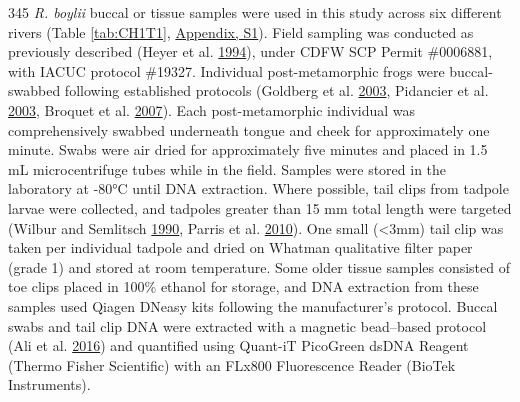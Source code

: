 \documentclass[proquest,12pt,final]{ucthesis-CA2012} %
\begin{document}
\begin{ucmainmatter}
345 \emph{R. boylii} buccal or tissue samples were used in this study
across six different rivers (Table \ref{tab:CH1T1},
\protect\hyperlink{supptables}{Appendix, S1}). Field sampling was
conducted as previously described (Heyer et al.
\protect\hyperlink{ref-heyer_measuring_1994}{1994}), under CDFW SCP
Permit \#0006881, with IACUC protocol \#19327. Individual
post-metamorphic frogs were buccal-swabbed following established
protocols (Goldberg et al.
\protect\hyperlink{ref-goldberg_frogs_2003}{2003}, Pidancier et al.
\protect\hyperlink{ref-pidancier_buccal_2003}{2003}, Broquet et al.
\protect\hyperlink{ref-broquet_buccal_2007}{2007}). Each
post-metamorphic individual was comprehensively swabbed underneath
tongue and cheek for approximately one minute. Swabs were air dried for
approximately five minutes and placed in 1.5 mL microcentrifuge tubes
while in the field. Samples were stored in the laboratory at -80°C until
DNA extraction. Where possible, tail clips from tadpole larvae were
collected, and tadpoles greater than 15 mm total length were targeted
(Wilbur and Semlitsch
\protect\hyperlink{ref-wilbur_ecological_1990}{1990}, Parris et al.
\protect\hyperlink{ref-parris_assessing_2010}{2010}). One small
(\textless{}3mm) tail clip was taken per individual tadpole and dried on
Whatman qualitative filter paper (grade 1) and stored at room
temperature. Some older tissue samples consisted of toe clips placed in
100\% ethanol for storage, and DNA extraction from these samples used
Qiagen DNeasy kits following the manufacturer's protocol. Buccal swabs
and tail clip DNA were extracted with a magnetic bead--based protocol
(Ali et al. \protect\hyperlink{ref-ali_rad_2016}{2016}) and quantified
using Quant-iT PicoGreen dsDNA Reagent (Thermo Fisher Scientific) with
an FLx800 Fluorescence Reader (BioTek Instruments).
\begin{landscape}\begin{table}


\end{table}
\end{landscape}
\end{ucmainmatter}
\end{document}
